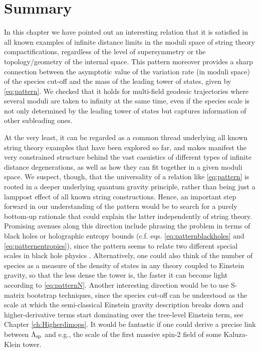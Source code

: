 \section{Summary}

In this chapter we have pointed out an interesting relation that it is satisfied in all known examples of infinite distance limits in the moduli space of string theory compactifications, regardless of the level of supersymmetry or the topology/geometry of the internal space. This pattern moreover provides a sharp connection between the asymptotic value of the variation rate (in moduli space) of the species cut-off and the mass of the leading tower of states, given by \eqref{eq:pattern}. We checked that it holds for multi-field geodesic trajectories where several moduli are taken to infinity at the same time, even if the species scale is not only determined by the leading tower of states but captures information of other subleading ones. 
	
At the very least, it can be regarded as a common thread underlying all known string theory examples that have been explored so far, and makes manifest the very constrained structure behind the vast casuistics of different types of infinite distance degenerations, as well as how they can fit together in a given moduli space. We suspect, though, that the universality of a relation like \eqref{eq:pattern} is rooted in a deeper underlying quantum gravity principle, rather than being just a lamppost effect of all known string constructions. Hence, an important step forward in our understanding of the pattern would be to search for a purely bottom-up rationale that could explain the latter independently of string theory. Promising avenues along this direction include phrasing the problem in terms of black holes or holographic entropy bounds (c.f. eqs. \eqref{eq:patternblackholes} and \eqref{eq:patternentropies}), since the pattern seems to relate two different special scales in black hole physics \cite{Bedroya:2024uva}. Alternatively, one could also think of the number of species as a measure of the density of states in any theory coupled to Einstein gravity, so that the less dense the tower is, the faster it can become light according to \eqref{eq:patternN}. Another interesting direction would be to use S-matrix bootstrap techniques, since the species cut-off can be understood as the scale at which the semi-classical Einstein gravity description breaks down and higher-derivative terms start dominating over the tree-level Einstein term, see Chapter \ref{ch:Higherdimops}. It would be fantastic if one could derive a precise link between $\Lambda_{\text{sp}}$ and e.g., the scale of the first massive spin-2 field of some Kaluza-Klein tower.
	
